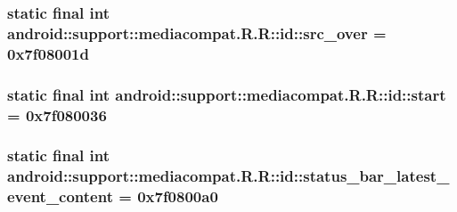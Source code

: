 \hypertarget{classandroid_1_1support_1_1mediacompat_1_1_r_1_1id_e125f907bcb335ea2f37e512823089ef}{
\subsubsection[{src\_\-over}]{\setlength{\rightskip}{0pt plus 5cm}static final int android::support::mediacompat.R.R::id::src\_\-over = 0x7f08001d}}
\label{classandroid_1_1support_1_1mediacompat_1_1_r_1_1id_e125f907bcb335ea2f37e512823089ef}


\hypertarget{classandroid_1_1support_1_1mediacompat_1_1_r_1_1id_78fa55982322125fb6b42fd4ad1a2238}{
\subsubsection[{start}]{\setlength{\rightskip}{0pt plus 5cm}static final int android::support::mediacompat.R.R::id::start = 0x7f080036}}
\label{classandroid_1_1support_1_1mediacompat_1_1_r_1_1id_78fa55982322125fb6b42fd4ad1a2238}


\hypertarget{classandroid_1_1support_1_1mediacompat_1_1_r_1_1id_49428b41274e7150a8129bda146c3d52}{
\subsubsection[{status\_\-bar\_\-latest\_\-event\_\-content}]{\setlength{\rightskip}{0pt plus 5cm}static final int android::support::mediacompat.R.R::id::status\_\-bar\_\-latest\_\-event\_\-content = 0x7f0800a0}}
\label{classandroid_1_1support_1_1mediacompat_1_1_r_1_1id_49428b41274e7150a8129bda146c3d52}


